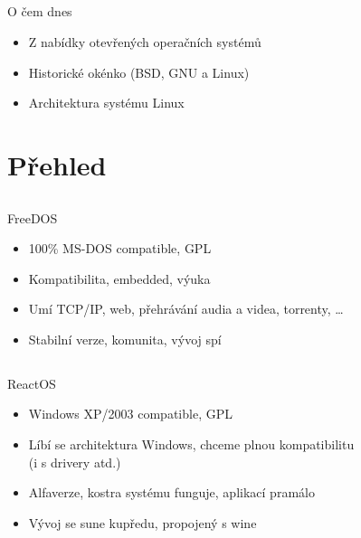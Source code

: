 \documentclass{beamer}
\begin{document}
\subsection{}
\begin{frame}{O čem dnes}
\begin{itemize}
\item Z nabídky otevřených operačních systémů
\item Historické okénko (BSD, GNU a Linux)
\item Architektura systému Linux
\end{itemize}
\end{frame}


\section{Přehled}

\subsection{}
\begin{frame}{FreeDOS}
\begin{itemize}
\item 100\% MS-DOS compatible, GPL
\item Kompatibilita, embedded, výuka
\item Umí TCP/IP, web, přehrávání audia a videa, torrenty, \dots
\item Stabilní verze, komunita, vývoj spí
\end{itemize}
\end{frame}

\subsection{}
\begin{frame}{ReactOS}
\begin{itemize}
\item Windows XP/2003 compatible, GPL
\item Líbí se architektura Windows, chceme plnou kompatibilitu\\ (i s drivery atd.)
\item Alfaverze, kostra systému funguje, aplikací pramálo
\item Vývoj se sune kupředu, propojený s wine
\end{itemize}
\end{frame}
\end{document}

